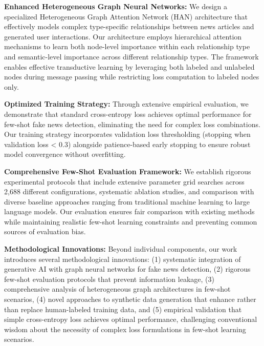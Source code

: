 
\textbf{Enhanced Heterogeneous Graph Neural Networks:} We design a specialized Heterogeneous Graph Attention Network (HAN) architecture that effectively models complex type-specific relationships between news articles and generated user interactions. Our architecture employs hierarchical attention mechanisms to learn both node-level importance within each relationship type and semantic-level importance across different relationship types. The framework enables effective transductive learning by leveraging both labeled and unlabeled nodes during message passing while restricting loss computation to labeled nodes only.

\textbf{Optimized Training Strategy:} Through extensive empirical evaluation, we demonstrate that standard cross-entropy loss achieves optimal performance for few-shot fake news detection, eliminating the need for complex loss combinations. Our training strategy incorporates validation loss thresholding (stopping when validation loss < 0.3) alongside patience-based early stopping to ensure robust model convergence without overfitting.

\textbf{Comprehensive Few-Shot Evaluation Framework:} We establish rigorous experimental protocols that include extensive parameter grid searches across 2,688 different configurations, systematic ablation studies, and comparison with diverse baseline approaches ranging from traditional machine learning to large language models. Our evaluation ensures fair comparison with existing methods while maintaining realistic few-shot learning constraints and preventing common sources of evaluation bias.


\textbf{Methodological Innovations:} Beyond individual components, our work introduces several methodological innovations: (1) systematic integration of generative AI with graph neural networks for fake news detection, (2) rigorous few-shot evaluation protocols that prevent information leakage, (3) comprehensive analysis of heterogeneous graph architectures in few-shot scenarios, (4) novel approaches to synthetic data generation that enhance rather than replace human-labeled training data, and (5) empirical validation that simple cross-entropy loss achieves optimal performance, challenging conventional wisdom about the necessity of complex loss formulations in few-shot learning scenarios.

